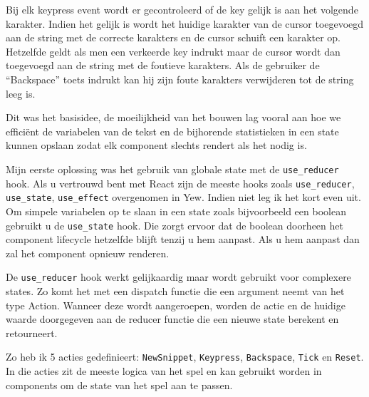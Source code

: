 Bij elk keypress event wordt er gecontroleerd of de key gelijk is aan het volgende karakter. Indien
het gelijk is wordt het huidige karakter van de cursor toegevoegd aan de string met de correcte
karakters en de cursor schuift een karakter op. Hetzelfde geldt als men een verkeerde key indrukt
maar de cursor wordt dan toegevoegd aan de string met de foutieve karakters. Als de gebruiker de
“Backspace” toets indrukt kan hij zijn foute karakters verwijderen tot de string leeg is. 

\clearpage

Dit was het basisidee, de moeilijkheid van het bouwen lag vooral aan hoe we efficiënt de variabelen
van de tekst en de bijhorende statistieken in een state kunnen opslaan zodat elk component slechts
rendert als het nodig is.  

Mijn eerste oplossing was het gebruik van globale state met de \texttt{use_reducer} hook.
Als u vertrouwd bent met React zijn de meeste hooks zoals \texttt{use_reducer},
\texttt{use_state}, \texttt{use_effect} overgenomen in Yew. Indien niet leg ik
het kort even uit. Om simpele variabelen op te slaan in een state zoals bijvoorbeeld een boolean
gebruikt u de \texttt{use_state} hook. Die zorgt ervoor dat de boolean doorheen het
component lifecycle hetzelfde blijft tenzij u hem aanpast. Als u hem aanpast dan zal het component
opnieuw renderen.  

De \texttt{use_reducer} hook werkt gelijkaardig maar wordt gebruikt voor complexere
states. Zo komt het met een dispatch functie die een argument neemt van het type Action. Wanneer
deze wordt aangeroepen, worden de actie en de huidige waarde doorgegeven aan de reducer functie die
een nieuwe state berekent en retourneert.

Zo heb ik 5 acties gedefinieert: \texttt{NewSnippet}, \texttt{Keypress},
\texttt{Backspace}, \texttt{Tick} en \texttt{Reset}. In die acties zit
de meeste logica van het spel en kan gebruikt worden in components om de state van het spel aan te
passen. 

